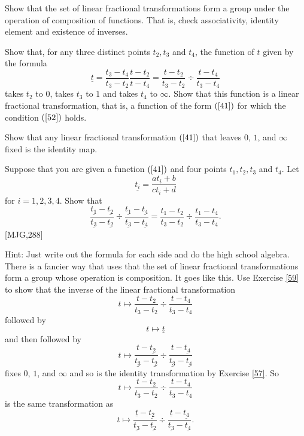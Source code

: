 \begin{exercise}
Show that the set of linear fractional transformations form a group
under the operation of composition of functions. That is, check
associativity, identity element and existence of inverses.
\end{exercise}

\begin{exercise}
\label{59}Show that, for any three distinct points $t_{2},t_{3}$ and $t_{4}$,
the function of $t$ given by the formula%
\[
\underline{t}=\frac{t_{3}-t_{4}}{t_{3}-t_{2}}\frac{t-t_{2}}{t-t_{4}}%
=\frac{t-t_{2}}{t_{3}-t_{2}}\div\frac{t-t_{4}}{t_{3}-t_{4}}%
\]
takes $t_{2}$ to $0$, takes $t_{3}$ to $1$ and takes $t_{4}$ to $\infty$. Show
that this function is a linear fractional transformation, that is, a function
of the form $\left(  \ref{41}\right)  $ for which the condition $\left(
\ref{52}\right)  $ holds.
\end{exercise}

\begin{exercise}
\label{57}Show that any linear fractional transformation $\left(
\ref{41}\right)  $ that leaves $0$, $1$, and $\infty$ fixed is the identity map.
\end{exercise}

\begin{exercise}
\label{42}Suppose that you are given a function $\left(  \ref{41}\right)  $
and four points $t_{1},t_{2},t_{3}$ and $t_{4}$. Let
\[
\underline{t_{i}}=\frac{at_{i}+b}{ct_{i}+d}%
\]
for $i=1,2,3,4$. Show that%
\[
\frac{\underline{t_{1}}-\underline{t_{2}}}{\underline{t_{3}}-\underline{t_{2}%
}}\div\frac{\underline{t_{1}}-\underline{t_{4}}}{\underline{t_{3}}%
-\underline{t_{4}}}=\frac{t_{1}-t_{2}}{t_{3}-t_{2}}\div\frac{t_{1}-t_{4}%
}{t_{3}-t_{4}}.
\]
[MJG,288]

Hint: Just write out the formula for each side and do the high school algebra.
There is a fancier way that uses that the set of linear fractional
transformations form a group whose operation is composition. It goes like
this. Use Exercise \ref{59} to show that the inverse of the linear fractional
transformation
\[
t\mapsto\frac{t-t_{2}}{t_{3}-t_{2}}\div\frac{t-t_{4}}{t_{3}-t_{4}}%
\]
followed by%
\[
t\mapsto\underline{t}%
\]
and then followed by
\[
t\mapsto\frac{t-\underline{t_{2}}}{\underline{t_{3}}-\underline{t_{2}}}%
\div\frac{t-\underline{t_{4}}}{\underline{t_{3}}-\underline{t_{4}}}%
\]
fixes $0$, $1$, and $\infty$ and so is the identity transformation by Exercise
\ref{57}. So%
\[
t\mapsto\frac{t-t_{2}}{t_{3}-t_{2}}\div\frac{t-t_{4}}{t_{3}-t_{4}}%
\]
is the same transformation as%
\[
t\mapsto\frac{\underline{t}-\underline{t_{2}}}{\underline{t_{3}}%
-\underline{t_{2}}}\div\frac{\underline{t}-\underline{t_{4}}}{\underline
{t_{3}}-\underline{t_{4}}}.
\]

\end{exercise}

